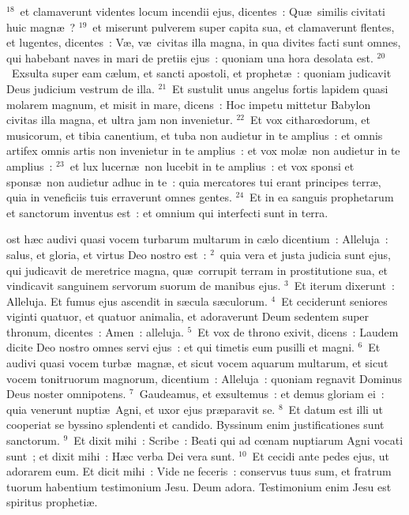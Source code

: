 ${}^{18}$~et clamaverunt videntes locum incendii ejus, dicentes~: Qu\ae\ similis civitati huic magn\ae~?
${}^{19}$~et miserunt pulverem super capita sua, et clamaverunt flentes, et lugentes, dicentes~: V\ae , v\ae\ civitas illa magna, in qua divites facti sunt omnes, qui habebant naves in mari de pretiis ejus~: quoniam una hora desolata est.
${}^{20}$~Exsulta super eam c\ae lum, et sancti apostoli, et prophet\ae~: quoniam judicavit Deus judicium vestrum de illa.
${}^{21}$~Et sustulit unus angelus fortis lapidem quasi molarem magnum, et misit in mare, dicens~: Hoc impetu mittetur Babylon civitas illa magna, et ultra jam non invenietur.
${}^{22}$~Et vox citharœdorum, et musicorum, et tibia canentium, et tuba non audietur in te amplius~: et omnis artifex omnis artis non invenietur in te amplius~: et vox mol\ae\ non audietur in te amplius~:
${}^{23}$~et lux lucern\ae\ non lucebit in te amplius~: et vox sponsi et spons\ae\ non audietur adhuc in te~: quia mercatores tui erant principes terr\ae , quia in veneficiis tuis erraverunt omnes gentes.
${}^{24}$~Et in ea sanguis prophetarum et sanctorum inventus est~: et omnium qui interfecti sunt in terra.

\bchapter
{}ost h\ae c audivi quasi vocem turbarum multarum in c\ae lo dicentium~: Alleluja~: salus, et gloria, et virtus Deo nostro est~:
${}^{2}$~quia vera et justa judicia sunt ejus, qui judicavit de meretrice magna, qu\ae\ corrupit terram in prostitutione sua, et vindicavit sanguinem servorum suorum de manibus ejus.
${}^{3}$~Et iterum dixerunt~: Alleluja. Et fumus ejus ascendit in s\ae cula s\ae culorum.
${}^{4}$~Et ceciderunt seniores viginti quatuor, et quatuor animalia, et adoraverunt Deum sedentem super thronum, dicentes~: Amen~: alleluja.
${}^{5}$~Et vox de throno exivit, dicens~: Laudem dicite Deo nostro omnes servi ejus~: et qui timetis eum pusilli et magni.
${}^{6}$~Et audivi quasi vocem turb\ae\ magn\ae , et sicut vocem aquarum multarum, et sicut vocem tonitruorum magnorum, dicentium~: Alleluja~: quoniam regnavit Dominus Deus noster omnipotens.
${}^{7}$~Gaudeamus, et exsultemus~: et demus gloriam ei~: quia venerunt nupti\ae\ Agni, et uxor ejus pr\ae paravit se.
${}^{8}$~Et datum est illi ut cooperiat se byssino splendenti et candido. Byssinum enim justificationes sunt sanctorum.
${}^{9}$~Et dixit mihi~: Scribe~: Beati qui ad cœnam nuptiarum Agni vocati sunt~; et dixit mihi~: H\ae c verba Dei vera sunt.
${}^{10}$~Et cecidi ante pedes ejus, ut adorarem eum. Et dicit mihi~: Vide ne feceris~: conservus tuus sum, et fratrum tuorum habentium testimonium Jesu. Deum adora. Testimonium enim Jesu est spiritus propheti\ae .


